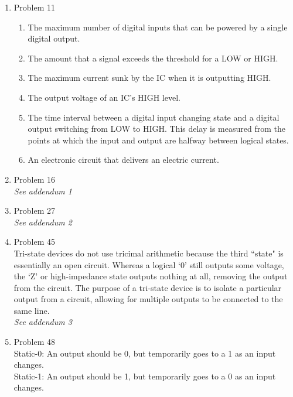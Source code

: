 \begin{enumerate}[leftmargin=2cm,labelsep=.5cm,label=\bf\arabic*.]

\item Problem 11
\begin{enumerate}
  \item The maximum number of digital inputs that can be powered by a single digital output.
  \item The amount that a signal exceeds the threshold for a LOW or HIGH. 
  \item The maximum current sunk by the IC when it is outputting HIGH.
  \item The output voltage of an IC's HIGH level.
  \item The time interval between a digital input changing state and a digital output switching from LOW to HIGH. This delay is measured from the points at which the input and output are halfway between logical states.
  \item An electronic circuit that delivers an electric current. 
\end{enumerate}

\item Problem 16 \\
\emph{See addendum 1}

\item Problem 27 \\
\emph{See addendum 2}

\item Problem 45 \\
Tri-state devices do not use tricimal arithmetic because the third ``state" is essentially an open circuit. Whereas a logical `0' still outputs some voltage, the `Z' or high-impedance state outputs nothing at all, removing the output from the circuit. The purpose of a tri-state device is to isolate a particular output from a circuit, allowing for multiple outputs to be connected to the same line. \\
\emph{See addendum 3}

\item Problem 48 \\
Static-0: An output should be 0, but temporarily goes to a 1 as an input changes. \\
Static-1: An output should be 1, but temporarily goes to a 0 as an input changes.

\end{enumerate}
